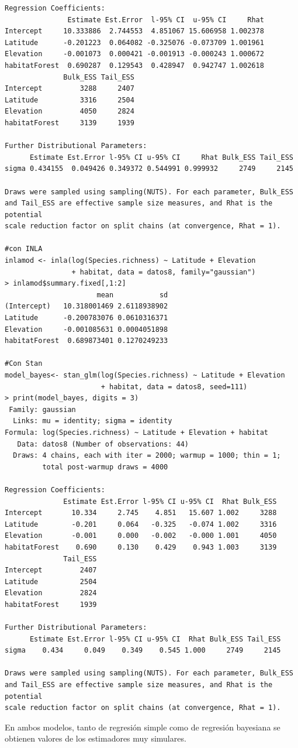 \documentclass[12pt,a4paper]{report}
\begin{document}
\begin{enumerate}
\begin{enumerate}
\begin{verbatim}
Regression Coefficients:
               Estimate Est.Error  l-95% CI  u-95% CI     Rhat
Intercept     10.333886  2.744553  4.851067 15.606958 1.002378
Latitude      -0.201223  0.064082 -0.325076 -0.073709 1.001961
Elevation     -0.001073  0.000421 -0.001913 -0.000243 1.000672
habitatForest  0.690287  0.129543  0.428947  0.942747 1.002618
              Bulk_ESS Tail_ESS
Intercept         3288     2407
Latitude          3316     2504
Elevation         4050     2824
habitatForest     3139     1939

Further Distributional Parameters:
      Estimate Est.Error l-95% CI u-95% CI     Rhat Bulk_ESS Tail_ESS
sigma 0.434155  0.049426 0.349372 0.544991 0.999932     2749     2145

Draws were sampled using sampling(NUTS). For each parameter, Bulk_ESS
and Tail_ESS are effective sample size measures, and Rhat is the potential
scale reduction factor on split chains (at convergence, Rhat = 1).

#con INLA
inlamod <- inla(log(Species.richness) ~ Latitude + Elevation 
                + habitat, data = datos8, family="gaussian")
> inlamod$summary.fixed[,1:2]
                      mean           sd
(Intercept)   10.318001469 2.6118938902
Latitude      -0.200783076 0.0610316371
Elevation     -0.001085631 0.0004051898
habitatForest  0.689873401 0.1270249233

#Con Stan
model_bayes<- stan_glm(log(Species.richness) ~ Latitude + Elevation 
                       + habitat, data = datos8, seed=111)
> print(model_bayes, digits = 3)
 Family: gaussian 
  Links: mu = identity; sigma = identity 
Formula: log(Species.richness) ~ Latitude + Elevation + habitat 
   Data: datos8 (Number of observations: 44) 
  Draws: 4 chains, each with iter = 2000; warmup = 1000; thin = 1;
         total post-warmup draws = 4000

Regression Coefficients:
              Estimate Est.Error l-95% CI u-95% CI  Rhat Bulk_ESS
Intercept       10.334     2.745    4.851   15.607 1.002     3288
Latitude        -0.201     0.064   -0.325   -0.074 1.002     3316
Elevation       -0.001     0.000   -0.002   -0.000 1.001     4050
habitatForest    0.690     0.130    0.429    0.943 1.003     3139
              Tail_ESS
Intercept         2407
Latitude          2504
Elevation         2824
habitatForest     1939

Further Distributional Parameters:
      Estimate Est.Error l-95% CI u-95% CI  Rhat Bulk_ESS Tail_ESS
sigma    0.434     0.049    0.349    0.545 1.000     2749     2145

Draws were sampled using sampling(NUTS). For each parameter, Bulk_ESS
and Tail_ESS are effective sample size measures, and Rhat is the potential
scale reduction factor on split chains (at convergence, Rhat = 1).
\end{verbatim}

En ambos modelos, tanto de regresión simple como de regresión bayesiana se obtienen valores de los estimadores muy simulares.
\end{enumerate}
\end{enumerate}
\end{document}
